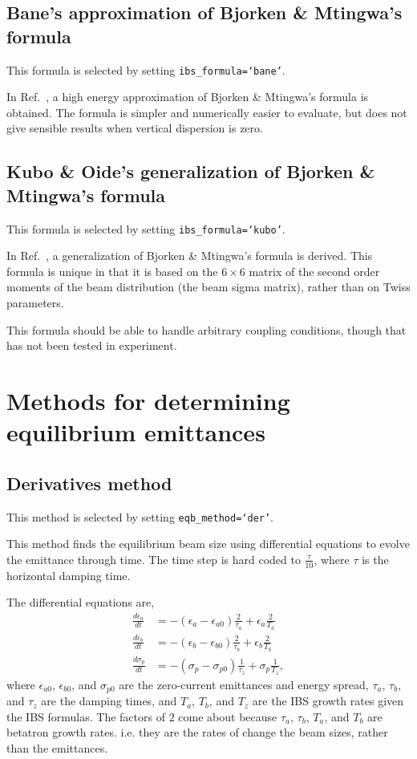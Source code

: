\documentclass[11pt]{article}
\begin{document}
\subsection{Bane's approximation of Bjorken \& Mtingwa's formula}
This formula is selected by setting {\tt ibs_formula=`bane'}.

In Ref.~\cite{b:bane-approx}, a high energy approximation of Bjorken \& Mtingwa's formula
is obtained.  The formula is simpler and numerically easier to evaluate, but does
not give sensible results when vertical dispersion is zero.

\subsection{Kubo \& Oide's generalization of Bjorken \& Mtingwa's formula}
This formula is selected by setting {\tt ibs_formula=`kubo'}.

In Ref.~\cite{b:kubo}, a generalization of Bjorken \& Mtingwa's formula
is derived.  This formula is unique in that it is based on the $6\times6$
matrix of the second order moments of the beam distribution (the beam sigma matrix),
rather than on Twiss parameters.

This formula should be able to handle arbitrary coupling conditions, though
that has not been tested in experiment.

\section{Methods for determining equilibrium emittances}

\subsection{Derivatives method}
This method is selected by setting {\tt eqb_method=`der'}.

This method finds the equilibrium beam size using differential equations to 
evolve the emittance through time.  The time step is hard coded to $\frac{\tau}{10}$,
where $\tau$ is the horizontal damping time.

The differential equations are,
\begin{align}
\frac{d\epsilon_a}{dt}&= -\left(\epsilon_a-\epsilon_{a0}\right)\frac{2}{\tau_a}+\epsilon_a\frac{2}{T_a}\label{e:da}\\
\frac{d\epsilon_b}{dt}&= -\left(\epsilon_b-\epsilon_{b0}\right)\frac{2}{\tau_b}+\epsilon_b\frac{2}{T_b}\label{e:db}\\
\frac{d \sigma_p}{dt}&= -\left(\sigma_p-\sigma_{p0}\right)\frac{1}{\tau_z}+\sigma_p\frac{1}{T_z}\label{e:dp},
\end{align}
where $\epsilon_{a0}$, $\epsilon_{b0}$, and $\sigma_{p0}$ are the zero-current emittances and energy spread,
$\tau_a$, $\tau_b$, and $\tau_z$ are the damping times, and $T_a$, $T_b$, and $T_z$ are the IBS
growth rates given the IBS formulas.  The factors of $2$ come about because $\tau_a$, $\tau_b$,
$T_a$, and $T_b$ are betatron growth rates.  i.e.  they are the rates of change the beam sizes,
rather than the emittances.
\end{document}
